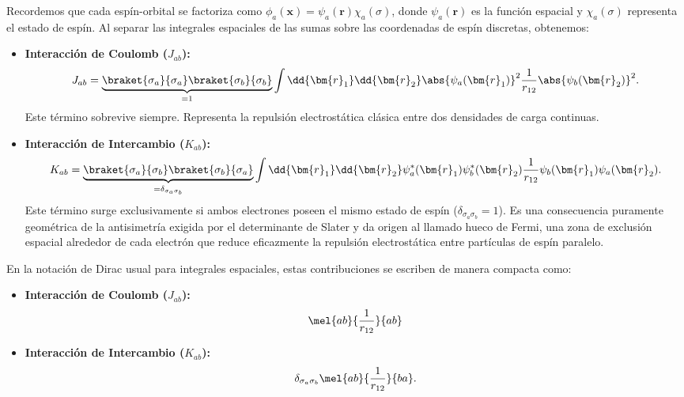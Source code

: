 Recordemos que cada espín-orbital se factoriza como \( \phi_a(\bm{x}) = \psi_a(\bm{r}) \chi_a(\sigma) \), donde \( \psi_a(\bm{r}) \) es la función espacial y \( \chi_a(\sigma) \) representa el estado de espín. Al separar las integrales espaciales de las sumas sobre las coordenadas de espín discretas, obtenemos:

\begin{itemize}
\item \textbf{Interacción de Coulomb (\(J_{ab}\)):}
  \begin{equation}
  J_{ab} = \underbrace{ \braket{\sigma_a}{\sigma_a} \braket{\sigma_b}{\sigma_b} }_{= 1} \int \dd{\bm{r}_1} \dd{\bm{r}_2} \abs{\psi_a(\bm{r}_1)}^2 \frac{1}{r_{12}} \abs{\psi_b(\bm{r}_2)}^2.
  \end{equation}
  Este término sobrevive siempre. Representa la repulsión electrostática clásica entre dos densidades de carga continuas.

\item \textbf{Interacción de Intercambio (\(K_{ab}\)):}
  \begin{equation}
  K_{ab} = \underbrace{ \braket{\sigma_a}{\sigma_b} \braket{\sigma_b}{\sigma_a} }_{= \delta_{\sigma_a \sigma_b}} \int \dd{\bm{r}_1} \dd{\bm{r}_2} \psi_a^*(\bm{r}_1)\psi_b^*(\bm{r}_2)\frac{1}{r_{12}}\psi_b(\bm{r}_1)\psi_a(\bm{r}_2).
  \end{equation}
  Este término surge exclusivamente si ambos electrones poseen el mismo estado de espín (\( \delta_{\sigma_a \sigma_b} = 1 \)). Es una consecuencia puramente geométrica de la antisimetría exigida por el determinante de Slater y da origen al llamado hueco de Fermi, una zona de exclusión espacial alrededor de cada electrón que reduce eficazmente la repulsión electrostática entre partículas de espín paralelo.
\end{itemize}

En la notación de Dirac usual para integrales espaciales, estas contribuciones se escriben de manera compacta como:

\begin{itemize}
\item \textbf{Interacción de Coulomb (\(J_{ab}\)):}
  \begin{equation}
  \mel{ab}{\frac{1}{r_{12}}}{ab}
  \end{equation}
\item \textbf{Interacción de Intercambio (\(K_{ab}\)):}
  \begin{equation}
  \delta_{\sigma_a \sigma_b} \mel{ab}{\frac{1}{r_{12}}}{ba}.
  \end{equation}
\end{itemize}

